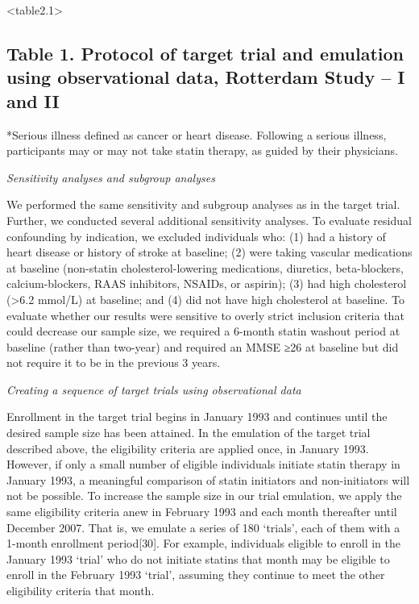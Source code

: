 \documentclass[
]{book}
\begin{document}
\newpage

\textless table2.1\textgreater{}

\hypertarget{table-1.-protocol-of-target-trial-and-emulation-using-observational-data-rotterdam-study-i-and-ii}{%
\subsection{Table 1. Protocol of target trial and emulation using observational data, Rotterdam Study -- I and II}\label{table-1.-protocol-of-target-trial-and-emulation-using-observational-data-rotterdam-study-i-and-ii}}

*Serious illness defined as cancer or heart disease. Following a serious illness, participants may or may not take statin therapy, as guided by their physicians.

\newpage

\emph{Sensitivity analyses and subgroup analyses}

We performed the same sensitivity and subgroup analyses as in the target trial. Further, we conducted several additional sensitivity analyses. To evaluate residual confounding by indication, we excluded individuals who: (1) had a history of heart disease or history of stroke at baseline; (2) were taking vascular medications at baseline (non-statin cholesterol-lowering medications, diuretics, beta-blockers, calcium-blockers, RAAS inhibitors, NSAIDs, or aspirin); (3) had high cholesterol (\textgreater6.2 mmol/L) at baseline; and (4) did not have high cholesterol at baseline. To evaluate whether our results were sensitive to overly strict inclusion criteria that could decrease our sample size, we required a 6-month statin washout period at baseline (rather than two-year) and required an MMSE ≥26 at baseline but did not require it to be in the previous 3 years.

\emph{Creating a sequence of target trials using observational data}

Enrollment in the target trial begins in January 1993 and continues until the desired sample size has been attained. In the emulation of the target trial described above, the eligibility criteria are applied once, in January 1993. However, if only a small number of eligible individuals initiate statin therapy in January 1993, a meaningful comparison of statin initiators and non-initiators will not be possible. To increase the sample size in our trial emulation, we apply the same eligibility criteria anew in February 1993 and each month thereafter until December 2007. That is, we emulate a series of 180 `trials', each of them with a 1-month enrollment period{[}30{]}. For example, individuals eligible to enroll in the January 1993 `trial' who do not initiate statins that month may be eligible to enroll in the February 1993 `trial', assuming they continue to meet the other eligibility criteria that month.
\end{document}
